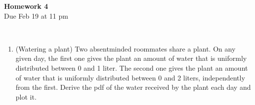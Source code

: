 \documentclass[12pt,twoside]{article}
\begin{document}
\begin{center}
{\large{\textbf{Homework 4}} } \vspace{0.2cm}\\
Due Feb 19 at 11 pm
\\
\end{center}
\\

\begin{enumerate}


\item (Watering a plant)
Two absentminded roommates share a plant. On any given day, the first one gives the plant an amount of water that is uniformly distributed between 0 and 1 liter. The second one gives the plant an amount of water that is uniformly distributed between 0 and 2 liters, independently from the first. Derive the pdf of the water received by the plant each day and plot it.


\end{enumerate}
\end{document}
